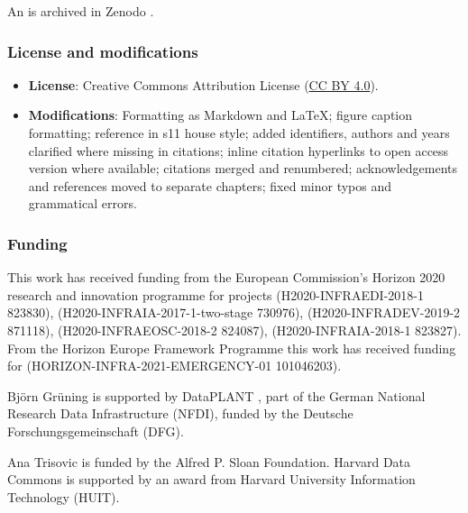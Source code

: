 An  is archived in Zenodo \cite{10.5281/zenodo.5833456}.

\subsubsection*{License and modifications}

\begin{itemize}
\tightlist
\item
  \textbf{License}: Creative Commons Attribution License
  (\href{https://spdx.org/licenses/CC-BY-4.0}{CC BY 4.0}).
\item
  \textbf{Modifications}: Formatting as Markdown and LaTeX; figure caption
  formatting; reference in s11 house style; added identifiers, authors
  and years clarified where missing in citations; inline citation
  hyperlinks to open access version where available; citations merged and renumbered; 
  acknowledgements and references moved to separate chapters; fixed minor typos and grammatical errors.
\end{itemize}


\subsubsection*{Funding}

This work has received funding from the European Commission's Horizon
2020 research and innovation programme for projects
(H2020-INFRAEDI-2018-1 823830),
(H2020-INFRAIA-2017-1-two-stage 730976),
(H2020-INFRADEV-2019-2 871118),
(H2020-INFRAEOSC-2018-2 824087),
(H2020-INFRAIA-2018-1 823827). From the Horizon Europe Framework
Programme this work has received funding for
(HORIZON-INFRA-2021-EMERGENCY-01 101046203).

Björn Grüning is supported by DataPLANT
, part of the German National Research Data Infrastructure
(NFDI), funded by the Deutsche Forschungsgemeinschaft (DFG).

Ana Trisovic is funded by the Alfred P. Sloan Foundation.
Harvard Data Commons is supported by an award from Harvard University
Information Technology (HUIT).


